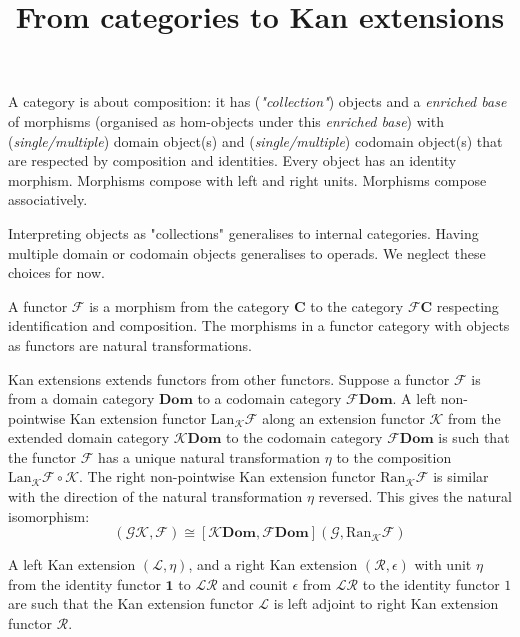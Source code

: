 \documentclass[10pt]{article}
\theoremstyle{plain}%
\theoremstyle{definition}
\theoremstyle{remark}
\begin{document}
\title{From categories to Kan extensions}

\maketitle

A category is about composition: it has (\textit{"collection"}) objects and a \textit{enriched base} of morphisms (organised as hom-objects under this \textit{enriched base}) with (\textit{single/multiple}) domain object(s) and (\textit{single/multiple}) codomain object(s) that are respected by composition and identities. Every object has an identity morphism. Morphisms compose with left and right units. Morphisms compose associatively.


Interpreting objects as "collections" generalises to internal categories. Having multiple domain or codomain objects generalises to operads. We neglect these choices for now. 

A functor $\mathcal{F}$ is a morphism from the category $\mathbf{C}$ to the category $\mathcal{F}\mathbf{C}$ respecting identification and composition. The morphisms in a functor category with objects as functors are natural transformations.

Kan extensions extends functors from other functors. Suppose a functor $\mathcal{F}$ is from a domain category $\mathbf{Dom}$ to a codomain category $\mathcal{F} \mathbf{Dom}$. A left non-pointwise Kan extension functor $\mathrm{Lan}_\mathcal{K} \mathcal{F}$ along an extension functor $\mathcal{K}$ from the extended domain category $\mathcal{K} \mathbf{Dom}$ to the codomain category $\mathcal{F} \mathbf{Dom}$ is such that the functor $\mathcal{F}$ has a unique natural transformation $\eta$ to the composition $\mathrm{Lan}_\mathcal{K} \mathcal{F} \circ \mathcal{K}$. The right non-pointwise Kan extension functor $\mathrm{Ran}_\mathcal{K} \mathcal{F}$ is similar with the direction of the natural transformation $\eta$ reversed.
This gives the natural isomorphism:
\begin{equation}
    [\mathbf{Dom}, \mathcal{F} \mathbf{Dom}](\mathcal{G} \mathcal{K}, \mathcal{F}) \cong 
    [\mathcal{K} \mathbf{Dom}, \mathcal{F} \mathbf{Dom}](\mathcal{G}, \mathrm{Ran}_\mathcal{K} \mathcal{F})
\end{equation}

A left Kan extension $(\mathcal{L}, \eta)$, and a right Kan extension $(\mathcal{R}, \epsilon)$ with unit $\eta$ from the identity functor $\mathbf{1}$ to $\mathcal{L} \mathcal{R}$ and counit $\epsilon$ from $\mathcal{L} \mathcal{R}$ to the identity functor $\mathcal{1}$ are such that the Kan extension functor $\mathcal{L}$ is left adjoint to right Kan extension functor $\mathcal{R}$.
\end{document}
